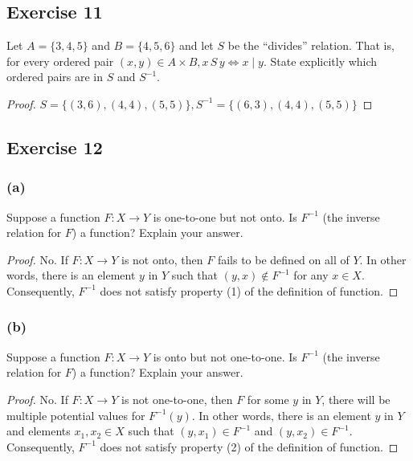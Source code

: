\documentclass[14pt]{extarticle}
\begin{document}
\subsection{Exercise 11}
Let \(A = \{3, 4, 5\}\) and \(B = \{4, 5, 6\}\) and let $S$ be the “divides” relation. That is, for every ordered pair
\((x, y) \in A \times B, x \, S \, y \iff x \mid y\). State explicitly which ordered pairs are in $S$ and $S^{-1}$.

\begin{proof}
        \(S = \{(3, 6), (4, 4), (5, 5)\}, S^{-1} = \{(6, 3), (4, 4), (5, 5)\}\)
\end{proof}

\subsection{Exercise 12}

\subsubsection{(a)}
Suppose a function \(F: X \to Y\) is one-to-one but not onto. Is \(F^{-1}\) (the inverse relation for $F$) a
function? Explain your answer.

\begin{proof}
        No. If \(F: X \to Y\) is not onto, then $F$ fails to be defined on all of $Y$. In other words, there is an element
        $y$ in $Y$ such that \((y, x) \notin F^{-1}\) for any \(x \in X\). Consequently, \(F^{-1}\) does not satisfy property
        (1) of the definition of function.
\end{proof}

\subsubsection{(b)}
Suppose a function \(F: X \to Y\) is onto but not one-to-one. Is \(F^{-1}\) (the inverse relation for $F$) a
function? Explain your answer.

\begin{proof}
        No. If \(F: X \to Y\) is not one-to-one, then $F$ for some $y$ in $Y$, there will be multiple potential values for
        \(F^{-1}(y)\). In other words, there is an element $y$ in $Y$ and elements \(x_1, x_2 \in X\) such that \((y, x_1)
        \in F^{-1}\) and \((y, x_2) \in F^{-1}\). Consequently, \(F^{-1}\) does not satisfy property (2) of the definition
        of function.
\end{proof}
\end{document}
